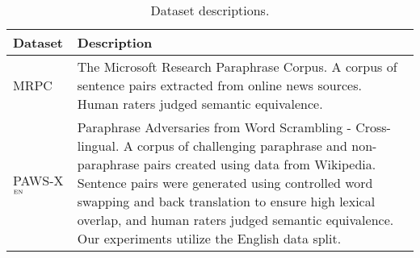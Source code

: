 \begin{table*}[h!]
\begin{tabular}{p{}p{}}
  \midrule
  \textbf{Dataset} & \textbf{Description} \\
  \midrule
  MRPC \citep{dolan2004unsupervised} & The Microsoft Research Paraphrase Corpus. A corpus of sentence pairs extracted from online news sources. Human raters judged semantic equivalence.\\
  \midrule
  PAWS-X$_{\textsc{en}}$ \citep{yang-etal-2019-paws} & Paraphrase Adversaries from Word Scrambling - Cross-lingual. A corpus of challenging paraphrase and non-paraphrase pairs created using data from Wikipedia. Sentence pairs were generated using controlled word swapping and back translation to ensure high lexical overlap, and human raters judged semantic equivalence. Our experiments utilize the English data split.\\
  \bottomrule
\end{tabular}
\caption{\label{table:dataset_descriptions} Dataset descriptions.}
\end{table*}